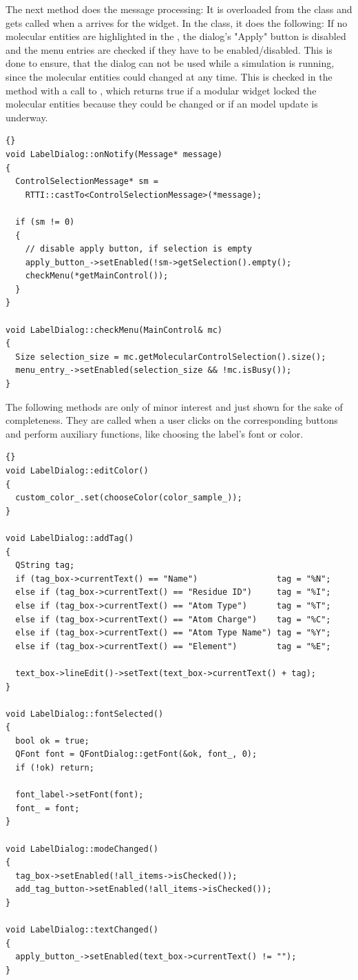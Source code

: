 \vspace{-0.2cm}
The next method  does the message processing:\label{onNotify}
It is overloaded from the  class and gets called when a  
arrives for the widget. In the  class, it does the following:
If no molecular entities are highlighted in the , the dialog's 
"Apply" button is disabled and the menu entries are checked if they have to be 
enabled/disabled. 
This is done to ensure, that the dialog can not be used while \eg a simulation is 
running, since the molecular entities could changed at any time. 
This is checked in the  method with a call to , 
which returns true if a modular widget locked the molecular entities because they could 
be changed or if an model update is underway.
\begin{lstlisting}{}
void LabelDialog::onNotify(Message* message)
{
  ControlSelectionMessage* sm = 
    RTTI::castTo<ControlSelectionMessage>(*message);

  if (sm != 0)
  {
    // disable apply button, if selection is empty
    apply_button_->setEnabled(!sm->getSelection().empty();
    checkMenu(*getMainControl());
  }
}

void LabelDialog::checkMenu(MainControl& mc)
{
  Size selection_size = mc.getMolecularControlSelection().size();
  menu_entry_->setEnabled(selection_size && !mc.isBusy());
}
\end{lstlisting}

The following methods are only of minor interest and just shown for the sake of completeness.
They are called when a user clicks on the
corresponding buttons and perform auxiliary functions, like choosing the label's 
font or color.
\begin{lstlisting}{}
void LabelDialog::editColor()
{
  custom_color_.set(chooseColor(color_sample_));
}

void LabelDialog::addTag()
{
  QString tag;
  if (tag_box->currentText() == "Name")                tag = "%N";
  else if (tag_box->currentText() == "Residue ID")     tag = "%I";
  else if (tag_box->currentText() == "Atom Type")      tag = "%T";
  else if (tag_box->currentText() == "Atom Charge")    tag = "%C";
  else if (tag_box->currentText() == "Atom Type Name") tag = "%Y";
  else if (tag_box->currentText() == "Element")        tag = "%E";

  text_box->lineEdit()->setText(text_box->currentText() + tag);
}

void LabelDialog::fontSelected()
{
  bool ok = true;
  QFont font = QFontDialog::getFont(&ok, font_, 0);
  if (!ok) return;

  font_label->setFont(font);
  font_ = font;
}

void LabelDialog::modeChanged()
{
  tag_box->setEnabled(!all_items->isChecked());
  add_tag_button->setEnabled(!all_items->isChecked());
}

void LabelDialog::textChanged()
{
  apply_button_->setEnabled(text_box->currentText() != "");
}
\end{lstlisting}

